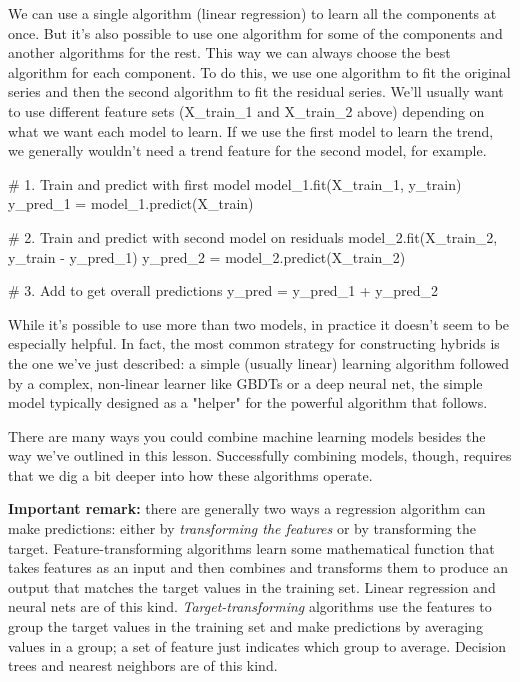 \documentclass[12pt]{report}
\begin{document}
We can use a single algorithm (linear regression) to learn all the components at once. But it's also possible to use one algorithm for some of the components and another algorithms for the rest. This way we can always choose the best algorithm for each component. To do this, we use one algorithm to fit the original series and then the second algorithm to fit the residual series. We'll usually want to use different feature sets (X\_train\_1 and X\_train\_2 above) depending on what we want each model to learn. If we use the first model to learn the trend, we generally wouldn't need a trend feature for the second model, for example.

\# 1. Train and predict with first model
model\_1.fit(X\_train\_1, y\_train)
y\_pred\_1 = model\_1.predict(X\_train)

\# 2. Train and predict with second model on residuals
model\_2.fit(X\_train\_2, y\_train - y\_pred\_1)
y\_pred\_2 = model\_2.predict(X\_train\_2)

\# 3. Add to get overall predictions
y\_pred = y\_pred\_1 + y\_pred\_2

While it's possible to use more than two models, in practice it doesn't seem to be especially helpful. In fact, the most common strategy for constructing hybrids is the one we've just described: a simple (usually linear) learning algorithm followed by a complex, non-linear learner like GBDTs or a deep neural net, the simple model typically designed as a "helper" for the powerful algorithm that follows.


There are many ways you could combine machine learning models besides the way we've outlined in this lesson. Successfully combining models, though, requires that we dig a bit deeper into how these algorithms operate.

\textbf{Important remark:} there are generally two ways a regression algorithm can make predictions: either by \textit{transforming the features} or by transforming the target. Feature-transforming algorithms learn some mathematical function that takes features as an input and then combines and transforms them to produce an output that matches the target values in the training set. Linear regression and neural nets are of this kind. \textit{Target-transforming} algorithms use the features to group the target values in the training set and make predictions by averaging values in a group; a set of feature just indicates which group to average. Decision trees and nearest neighbors are of this kind.
\end{document}

